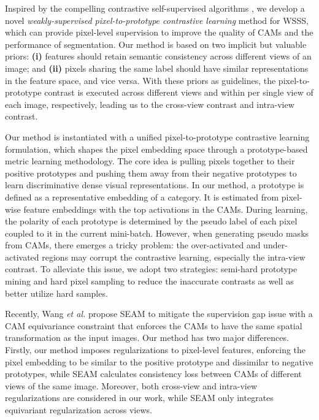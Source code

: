 \documentclass[10pt,twocolumn,letterpaper]{article}
\begin{document}
Inspired by the compelling contrastive self-supervised algorithms \cite{jaiswal2021CLsurvey1}, we develop a novel \textit{weakly-supervised pixel-to-prototype contrastive learning} method for WSSS, which can provide pixel-level supervision to improve the quality of CAMs and the performance of segmentation.
Our method is based on two implicit but valuable priors:
\textbf{(i)} features should retain semantic consistency across different views of an image; and
\textbf{(ii)} pixels sharing the same label should have similar representations in the feature space, and vice versa.
With these priors as guidelines, the pixel-to-prototype contrast is executed across different views and within per single view of each image, respectively, leading us to the cross-view contrast and intra-view contrast.


Our method is instantiated with a unified pixel-to-prototype contrastive learning formulation, which shapes the pixel embedding space through a prototype-based metric learning methodology. 
The core idea is pulling pixels together to their positive prototypes and pushing them away from their negative prototypes to learn discriminative dense visual representations. 
In our method, a prototype is defined as a representative embedding of a category. It is estimated from pixel-wise feature embeddings with the top
activations in the CAMs. 
During learning, the polarity of each prototype is determined by the pseudo label of each pixel coupled to it in the current mini-batch. 
However, when generating pseudo masks from CAMs, there emerges a tricky problem: the over-activated and under-activated regions may corrupt the contrastive learning, especially the intra-view contrast.
To alleviate this issue, we adopt two strategies: semi-hard prototype mining and hard pixel sampling to reduce the inaccurate contrasts as well as better utilize hard samples.


Recently, Wang \textit{et al.} \cite{wang2020selfSEAM} propose SEAM to mitigate the supervision gap issue with a CAM equivariance constraint that enforces the CAMs to have the same spatial transformation as the input images. Our method has two major differences.
Firstly, our method imposes regularizations to pixel-level features, enforcing the pixel embedding to be similar to the positive prototype and dissimilar to negative prototypes, while SEAM calculates consistency loss between CAMs of different views of the same image. 
Moreover, both cross-view and intra-view regularizations are considered in our work, while SEAM only integrates equivariant regularization across views.
\end{document}

